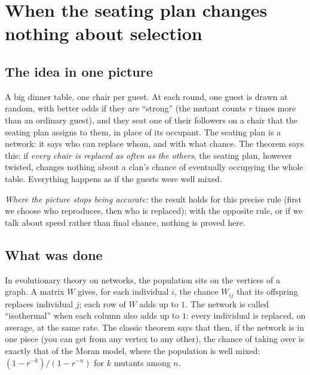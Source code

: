 \chapter[The seating plan and selection]{When the seating plan changes nothing about selection}

\section*{The idea in one picture}

\begin{analogie}
A big dinner table, one chair per guest. At each round, one guest is drawn at random, with better odds if they are
``strong'' (the mutant counts $r$ times more than an ordinary guest), and they seat one of their followers on a
chair that the seating plan assigns to them, in place of its occupant. The seating plan is a network: it says who
can replace whom, and with what chance. The theorem says this: if \emph{every chair is replaced as often as the
others}, the seating plan, however twisted, changes nothing about a clan's chance of eventually occupying the whole
table. Everything happens as if the guests were well mixed.

\emph{Where the picture stops being accurate:} the result holds for this precise rule (first we choose who
reproduces, then who is replaced); with the opposite rule, or if we talk about speed rather than final chance,
nothing is proved here.
\end{analogie}

\section*{What was done}

In evolutionary theory on networks, the population sits on the vertices of a graph. A matrix $W$ gives, for each
individual $i$, the chance $W_{ij}$ that its offspring replaces individual $j$; each row of $W$ adds up to $1$. The
network is called ``isothermal'' when each column also adds up to $1$: every individual is replaced, on average, at
the same rate. The classic theorem says that then, if the network is in one piece (you can get from any vertex to
any other), the chance of taking over is exactly that of the Moran model, where the population is well mixed:
$(1-r^{-k})/(1-r^{-n})$ for $k$ mutants among $n$.

